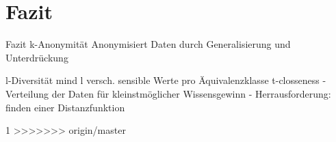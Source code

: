 \section{Fazit}
\begin{frame} {Fazit}
	k-Anonymität
	Anonymisiert Daten durch Generalisierung und Unterdrückung
	
	l-Diversität
	mind l versch. sensible Werte pro Äquivalenzklasse
	t-closseness
	- Verteilung  der Daten für kleinstmöglicher Wissensgewinn	
	- Herrausforderung: finden einer    	  Distanzfunktion
\end{frame}
1
>>>>>>> origin/master
